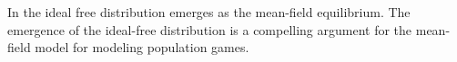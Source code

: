 In  the ideal free distribution emerges as the mean-field equilibrium. The emergence of the ideal-free distribution is a compelling argument for the mean-field model for modeling population games.
\begin{comment}
\begin{example}
  If we go back to the model in \Cref{prop:doubleup} and denote the identity matrix on $\R^n$ by $I_n$. Assume that $A=-I_2$ $b=(2,1)$ then assuming a monomorphic population leads to a dramatic increase in fitness and a different distribution compared to the mean-field approach. Assuming a monomorphic population in \Cref{prop:doubleup}, the payoff function is affine-quadratic $U(p,N p) = N \ip{p}{Ap} + \ip{b}{p}$.

\end{example}
In comparison, \Cref{prop:doubleup} shows that assuming a monomorphic population doubles the payoff compared to the ideal free distribution. This shows that the selflessness of an individual from assuming a monomorphic population is not insignificant, even in simple models.
\end{comment}
